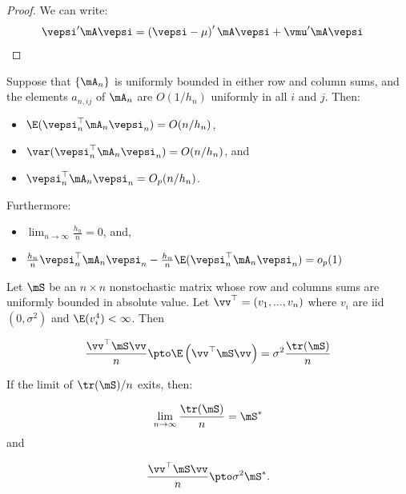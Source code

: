 
\begin{proof}
We can write:
\begin{equation*}
\begin{aligned}
\vepsi'\mA\vepsi & = \left(\vepsi - \mu\right)'\mA\vepsi + \vmu'\mA\vepsi
\end{aligned}
\end{equation*}
\end{proof}

\begin{lemma}\label{lemma:O-lemma-lee}
Suppose that  $\left\lbrace \mA_n\right\rbrace$ is uniformly bounded in either row and column sums, and the elements $a_{n, ij}$ of $\mA_n$ are $O(1/h_n)$ uniformly in all $i$ and $j$. Then:

\begin{itemize}
  \item $\E(\vepsi_n^\top\mA_n\vepsi_n) = O(n/h_n)$,
  \item $\var(\vepsi_n^\top\mA_n\vepsi_n)=O(n/h_n)$, and
  \item $\vepsi_n^\top\mA_n\vepsi_n = O_p(n/h_n)$.
\end{itemize}

Furthermore:

\begin{itemize}
\item $\lim_{n\to\infty}\frac{h_n}{n} = 0$, and,
\item $\frac{h_n}{n}\vepsi_n^\top\mA_n\vepsi_n - \frac{h_n}{n}\E(\vepsi_n^\top\mA_n\vepsi_n) = o_p(1)$
\end{itemize}
\end{lemma}


\begin{theorem}\label{teo:quadratic-forms-ley}
Let $\mS$ be an $n\times n$ nonstochastic matrix whose row and columns sums are uniformly bounded in absolute value. Let $\vv^{\top}=(v_1, ..., v_n)$ where $v_i$ are iid $(0, \sigma^2)$ and $\E(v_i^4)<\infty$. Then

\begin{equation*}
  \frac{\vv^\top \mS \vv}{n}\pto \E\left(\vv^\top \mS \vv\right) = \sigma^2\frac{\tr(\mS)}{n}
\end{equation*}

If the limit of $\tr(\mS)/n$ exits, then:

\begin{equation*}
\lim_{n\to\infty}\frac{\tr(\mS)}{n} = \mS^*
\end{equation*}
%
and

\begin{equation*}
  \frac{\vv^\top \mS \vv}{n}\pto \sigma^2\mS^*.
\end{equation*}
\end{theorem}




